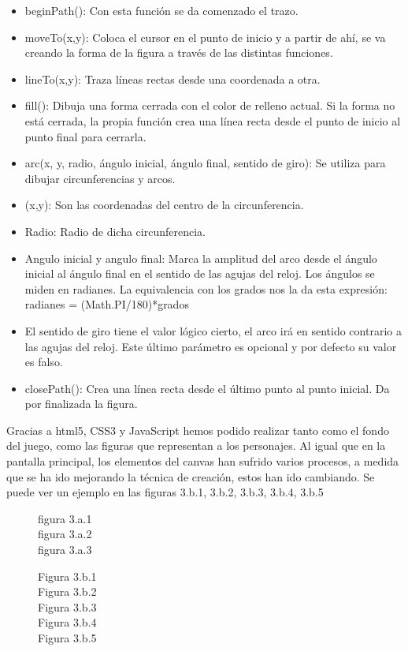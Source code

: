 \begin{itemize}
 \item beginPath():  Con esta función se da comenzado el trazo.
 \item moveTo(x,y): Coloca el cursor en el punto de inicio y a partir de ahí, se va creando la forma de la figura a través de las distintas 
 funciones.
 \item lineTo(x,y): Traza líneas rectas desde una coordenada a otra.
 \item fill(): Dibuja una forma cerrada con el color de relleno actual. Si la forma no está cerrada, la propia función crea una línea recta 
 desde el punto de inicio  al punto final para cerrarla.
 \item arc(x, y, radio, ángulo inicial, ángulo final, sentido de giro):  Se utiliza para dibujar circunferencias y arcos.
 \item (x,y): Son las coordenadas del centro de la circunferencia.
 \item Radio: Radio de dicha circunferencia.
 \item Angulo inicial y angulo final: Marca la amplitud del arco desde el ángulo inicial al ángulo final en el sentido de las agujas del reloj. Los ángulos se miden en radianes. La equivalencia con los grados nos la da esta expresión:
 radianes = (Math.PI/180)*grados
 \item El sentido de giro tiene el valor lógico cierto, el arco irá en sentido contrario a las agujas del reloj. Este último parámetro es 
 opcional y por defecto su valor es falso.
 \item closePath(): Crea una línea recta desde el último punto al punto inicial. Da por finalizada la figura.
\end{itemize}

Gracias a html5, CSS3 y JavaScript hemos podido realizar tanto como el fondo del juego, como las figuras que representan a los personajes.
Al igual que en la pantalla principal, los elementos del canvas han sufrido varios procesos, a medida que se ha ido mejorando la técnica de creación, estos han ido cambiando.
Se puede ver un ejemplo en las figuras 3.b.1, 3.b.2, 3.b.3, 3.b.4, 3.b.5

\begin{figure}[p]
figura 3.a.1\\
figura 3.a.2\\
figura 3.a.3\\
\end{figure}

\begin{figure}[p]
Figura 3.b.1\\
Figura 3.b.2\\
Figura 3.b.3\\
Figura 3.b.4\\
Figura 3.b.5\\
\end{figure}
